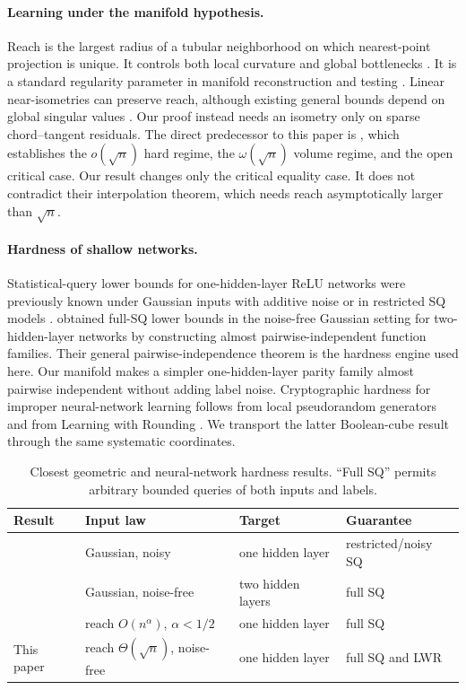 \documentclass{article}
\theoremstyle{definition}
\theoremstyle{remark}
\newcommand{\1}{\mathbf 1}
\begin{document}
\paragraph{Learning under the manifold hypothesis.} Reach is the largest radius of a tubular neighborhood on which nearest-point projection is unique. It controls both local curvature and global bottlenecks \citep{federer1959curvature,aamari2019reach}. It is a standard regularity parameter in manifold reconstruction and testing \citep{niyogi2008homology,narayanan2010sample,fefferman2016testing}. Linear near-isometries can preserve reach, although existing general bounds depend on global singular values \citep{eftekhari2017bilipschitz}. Our proof instead needs an isometry only on sparse chord--tangent residuals. The direct predecessor to this paper is \citet{kiani2024manifold}, which establishes the $o(\sqrt n)$ hard regime, the $\omega(\sqrt n)$ volume regime, and the open critical case. Our result changes only the critical equality case. It does not contradict their interpolation theorem, which needs reach asymptotically larger than $\sqrt n$.

\paragraph{Hardness of shallow networks.} Statistical-query lower bounds for one-hidden-layer ReLU networks were previously known under Gaussian inputs with additive noise or in restricted SQ models \citep{diakonikolas2020relu,vempala2019gradient}. \citet{chen2022noisefree} obtained full-SQ lower bounds in the noise-free Gaussian setting for two-hidden-layer networks by constructing almost pairwise-independent function families. Their general pairwise-independence theorem is the hardness engine used here. Our manifold makes a simpler one-hidden-layer parity family almost pairwise independent without adding label noise. Cryptographic hardness for improper neural-network learning follows from local pseudorandom generators \citep{daniely2021local} and from Learning with Rounding \citep{chen2022noisefree}. We transport the latter Boolean-cube result through the same systematic coordinates.

\begin{table}[t]
\centering
\small
\caption{Closest geometric and neural-network hardness results. ``Full SQ'' permits arbitrary bounded queries of both inputs and labels.}
\label{tab:comparison}
\begin{tabular}{@{}llll@{}}
\toprule
Result & Input law & Target & Guarantee \\
\midrule
\citet{diakonikolas2020relu} & Gaussian, noisy & one hidden layer & restricted/noisy SQ \\
\citet{chen2022noisefree} & Gaussian, noise-free & two hidden layers & full SQ \\
\citet{kiani2024manifold} & reach $O(n^\alpha)$, $\alpha<1/2$ & one hidden layer & full SQ \\
This paper & reach $\Theta(\sqrt n)$, noise-free & one hidden layer & full SQ and LWR \\
\bottomrule
\end{tabular}
\end{table}
\end{document}

